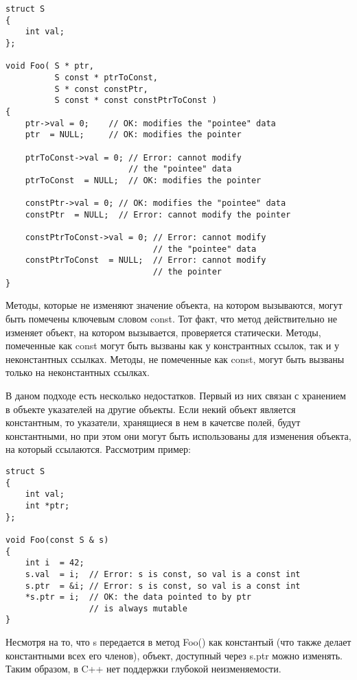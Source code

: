 \begin{lstlisting}[caption=Константный указатель, label=code:const_pointer]
struct S
{ 
    int val;
};

void Foo( S * ptr,
          S const * ptrToConst,
          S * const constPtr,
          S const * const constPtrToConst )
{
    ptr->val = 0;    // OK: modifies the "pointee" data
    ptr  = NULL;     // OK: modifies the pointer
 
    ptrToConst->val = 0; // Error: cannot modify 
                         // the "pointee" data
    ptrToConst  = NULL;  // OK: modifies the pointer
 
    constPtr->val = 0; // OK: modifies the "pointee" data
    constPtr  = NULL;  // Error: cannot modify the pointer
 
    constPtrToConst->val = 0; // Error: cannot modify 
                              // the "pointee" data
    constPtrToConst  = NULL;  // Error: cannot modify 
                              // the pointer
}
\end{lstlisting}

Методы, которые не изменяют значение объекта, на котором вызываются, могут быть помечены ключевым словом const. Тот факт, что метод действительно не изменяет объект, на котором вызывается, проверяется статически. Методы, помеченные как const могут быть вызваны как у констрантных ссылок, так и у неконстантных ссылках. Методы, не помеченные как const, могут быть вызваны только на неконстантных ссылках. 

В даном подходе есть несколько недостатков. Первый из них связан с хранением в объекте указателей на другие объекты. Если некий объект является константным, то указатели, хранящиеся в нем в качетсве полей, будут константными, но при этом они могут быть использованы для изменения объекта, на который ссылаются. Рассмотрим пример: 

\begin{lstlisting}[caption=Пример изменения значения по указателю в константном методе, label=code:pointer]
struct S
{ 
    int val;
    int *ptr;
};
 
void Foo(const S & s)
{
    int i  = 42;
    s.val  = i;  // Error: s is const, so val is a const int
    s.ptr  = &i; // Error: s is const, so val is a const int
    *s.ptr = i;  // OK: the data pointed to by ptr 
                 // is always mutable
}
\end{lstlisting}

Несмотря на то, что s передается в метод Foo() как константый (что также делает константными всех его членов), объект, доступный через s.ptr можно изменять. Таким образом, в C++ нет поддержки глубокой неизменяемости.

